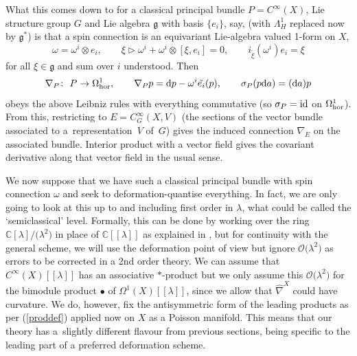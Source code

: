 \documentclass[10pt,a4paper]{amsart}
\numberwithin{equation}{section}
\newcommand{\C}{{\mathbb{C}}}
\newcommand{\<}{{\langle}}
\renewcommand{\>}{{\rangle}}
\newcommand{\tens}{\otimes}
\newcommand{\id}{{\rm id}}
\newcommand{\extd}{{\rm d}}
\newcommand{\la}{{\triangleright}}
\newcommand{\cg}{{\mathfrak{g}}}
\begin{document}
What this comes down to for a classical principal bundle $P=C^\infty(X)$, Lie structure group $G$ and Lie algebra $\cg$ with basis $\{e_i\}$, say, (with $\Lambda^1_H$ replaced now by $\cg^*$) is that a spin connection is an equivariant Lie-algebra valued 1-form on $X$,
 \begin{equation}\label{classomega} \omega=\omega^i\tens e_i,\qquad \xi\la \omega^i+\omega^i\tens [\xi,e_i]=0,\qquad i_{\tilde\xi}(\omega^i) e_i=\xi\end{equation}
 for all $\xi\in\cg$ and sum over $i$ understood. Then
\begin{equation}\label{classnabla}\nabla_P\colon \ P\to \Omega^1_{\rm hor},\qquad \nabla_Pp= \extd p- \omega^i\tilde{e_i}(p),\qquad \sigma_P(p\extd a)=(\extd a)p\end{equation}
obeys the above Leibniz rules with everything commutative (so $\sigma_P=\id$ on $\Omega^1_{\rm hor}$). From this, restricting to $E=C^\infty_G(X,V)$ (the sections of the vector bundle associated to a~representation~$V$ of~$G$) gives the induced connection $\nabla_E$ on the associated bundle. Interior product with a vector field gives the covariant derivative along that vector field in the usual sense.

We now suppose that we have such a classical principal bundle with spin connection $\omega$ and seek to deformation-quantise everything. In fact, we are only going to look at this up to and including first order in $\lambda$, what could be called the `semiclassical' level. Formally, this can be done by working over the ring $\C[\lambda]/\big(\lambda^2\big)$ in place of $\C[[\lambda]]$ as explained in \cite{BegMa:prg}, but for continuity with the general scheme, we will use the deformation point of view but ignore $\mathcal{O}\big(\lambda^2\big)$ as errors to be corrected in a 2nd order theory. We can assume that $C^\infty(X)[[\lambda]]$ has an associative $*$-product but we only assume this $\mathcal{O}\big(\lambda^2\big)$ for the bimodule product $\bullet$ of $\Omega^1(X)[[\lambda]]$, since we allow that $\hat\nabla^X$ could have curvature. We do, however, fix the antisymmetric form of the leading products as per (\ref{proddef}) applied now on $X$ as a Poisson manifold. This means that our theory has a~slightly different flavour from previous sections, being specific to the leading part of a preferred deformation scheme.
\end{document}
